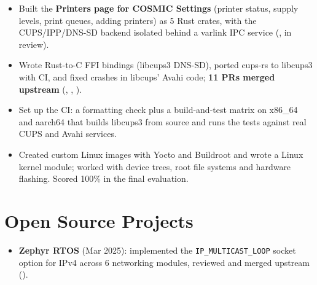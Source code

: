 \documentclass[10pt]{article}
\begin{document}
\begin{itemize}
  \item Built the \textbf{Printers page for COSMIC Settings} (printer status, supply levels, print queues, adding printers) as 5 Rust crates, with the CUPS/IPP/DNS-SD backend isolated behind a varlink IPC service (, in review).
  \item Wrote Rust-to-C FFI bindings (libcups3 DNS-SD), ported cups-rs to libcups3 with CI, and fixed crashes in libcups' Avahi code; \textbf{11 PRs merged upstream} (, , ).
  \item Set up the CI: a formatting check plus a build-and-test matrix on x86\_64 and aarch64 that builds libcups3 from source and runs the tests against real CUPS and Avahi services.
\end{itemize}
\begin{itemize}
  \item Created custom Linux images with Yocto and Buildroot and wrote a Linux kernel module; worked with device trees, root file systems and hardware flashing. Scored 100\% in the final evaluation.
\end{itemize}

\section*{Open Source Projects}
\begin{itemize}
  \item \textbf{Zephyr RTOS} (Mar 2025): implemented the \texttt{IP\_MULTICAST\_LOOP} socket option for IPv4 across 6 networking modules, reviewed and merged upstream ().
\end{itemize}
\end{document}
